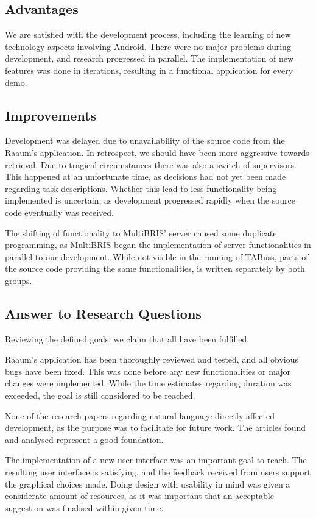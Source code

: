 \subsection{Advantages}
We are satisfied with the development process, including the learning of new technology aspects involving Android. There were no major problems during development, and research progressed in parallel. The implementation of new features was done in iterations, resulting in a functional application for every demo.

\subsection{Improvements}
Development was delayed due to unavailability of the source code from the Raaum's application\cite{mag}. In retrospect, we should have been more aggressive towards retrieval. Due to tragical circumstances there was also a switch of supervisors. This happened at an unfortunate time, as decisions had not yet been made regarding task descriptions. Whether this lead to less functionality being implemented is uncertain, as development progressed rapidly when the source code eventually was received. 

The shifting of functionality to MultiBRIS' server \cite{multibris} caused some duplicate programming, as MultiBRIS began the implementation of server functionalities in parallel to our development. While not visible in the running of TABuss, parts of the source code providing the same functionalities, is written separately by both groups. 

\subsection{Answer to Research Questions}
Reviewing the defined goals, we claim that all have been fulfilled. 

Raaum's application\cite{mag} has been thoroughly reviewed and tested, and all obvious bugs have been fixed. This was done before any new functionalities or major changes were implemented. While the time estimates regarding duration was exceeded, the goal is still considered to be reached.

None of the research papers regarding natural language directly affected development, as the purpose was to facilitate for future work. The articles found and analysed represent a good foundation.

The implementation of a new user interface was an important goal to reach. The resulting user interface is satisfying, and the feedback received from users support the graphical choices made. Doing design with usability in mind was given a considerate amount of resources, as it was important that an acceptable suggestion was finalised within given time.

